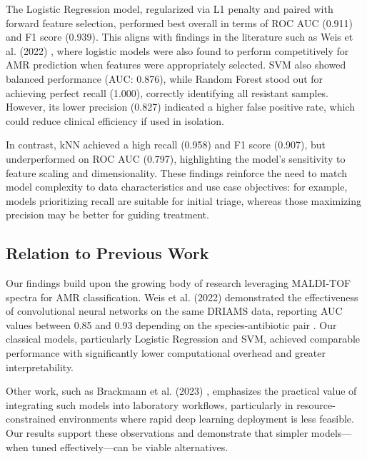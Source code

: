 \documentclass{article}
\begin{document}
The Logistic Regression model, regularized via L1 penalty and paired with forward feature selection, performed best overall in terms of ROC AUC (0.911) and F1 score (0.939). This aligns with findings in the literature such as Weis et al. (2022) \citep{doi:10.1038/s41591-021-01619-9}, where logistic models were also found to perform competitively for AMR prediction when features were appropriately selected. SVM also showed balanced performance (AUC: 0.876), while Random Forest stood out for achieving perfect recall (1.000), correctly identifying all resistant samples. However, its lower precision (0.827) indicated a higher false positive rate, which could reduce clinical efficiency if used in isolation.

In contrast, kNN achieved a high recall (0.958) and F1 score (0.907), but underperformed on ROC AUC (0.797), highlighting the model’s sensitivity to feature scaling and dimensionality. These findings reinforce the need to match model complexity to data characteristics and use case objectives: for example, models prioritizing recall are suitable for initial triage, whereas those maximizing precision may be better for guiding treatment.

\subsection*{Relation to Previous Work}
Our findings build upon the growing body of research leveraging MALDI-TOF spectra for AMR classification. Weis et al. (2022) demonstrated the effectiveness of convolutional neural networks on the same DRIAMS data, reporting AUC values between 0.85 and 0.93 depending on the species-antibiotic pair \citep{doi:10.1038/s41591-021-01619-9}. Our classical models, particularly Logistic Regression and SVM, achieved comparable performance with significantly lower computational overhead and greater interpretability.

Other work, such as Brackmann et al. (2023) \citep{doi:10.1093/cid/ciad080}, emphasizes the practical value of integrating such models into laboratory workflows, particularly in resource-constrained environments where rapid deep learning deployment is less feasible. Our results support these observations and demonstrate that simpler models—when tuned effectively—can be viable alternatives.
\end{document}
